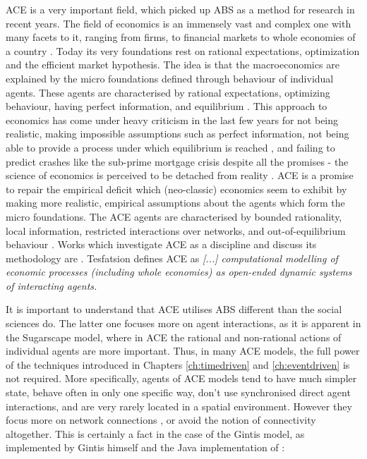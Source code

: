 ACE is a very important field, which picked up ABS as a method for research in recent years. The field of economics is an immensely vast and complex one with many facets to it, ranging from firms, to financial markets to whole economies of a country \cite{bowles_understanding_2005}. Today its very foundations rest on rational expectations, optimization and the efficient market hypothesis. The idea is that the macroeconomics are explained by the micro foundations \cite{colell_microeconomic_1995} defined through behaviour of individual agents. These agents are characterised by rational expectations, optimizing behaviour, having perfect information, and equilibrium \cite{focardi_is_2015}.
This approach to economics has come under heavy criticism in the last few years for not being realistic, making impossible assumptions such as perfect information, not being able to provide a process under which equilibrium is reached \cite{kirman_complex_2010}, and failing to predict crashes like the sub-prime mortgage crisis despite all the promises - the science of economics is perceived to be detached from reality \cite{focardi_is_2015}. 
ACE is a promise to repair the empirical deficit which (neo-classic) economics seem to exhibit by making more realistic, empirical assumptions about the agents which form the micro foundations. The ACE agents are characterised by bounded rationality, local information, restricted interactions over networks, and out-of-equilibrium behaviour \cite{farmer_economy_2009}. 
Works which investigate ACE as a discipline and discuss its methodology are \cite{ballot_agent-based_2015,blume_introduction_2015,richiardi_agent-based_2007,tesfatsion_agent-based_2006}.
Tesfatsion \cite{tesfatsion_agent-based_2017} defines ACE as \textit{[...] computational modelling of economic processes (including whole economies) as open-ended dynamic systems of interacting agents.}

It is important to understand that ACE utilises ABS different than the social sciences do. The latter one focuses more on agent interactions, as it is apparent in the Sugarscape model, where in ACE the rational and non-rational actions of individual agents are more important. Thus, in many ACE models, the full power of the techniques introduced in Chapters \ref{ch:timedriven} and \ref{ch:eventdriven} is not required. More specifically, agents of ACE models tend to have much simpler state, behave often in only one specific way, don't use synchronised direct agent interactions, and are very rarely located in a spatial environment. However they focus more on network connections \cite{glasserman_contagion_2015,wilhite_economic_2006}, or avoid the notion of connectivity altogether. This is certainly a fact in the case of the Gintis model, as implemented by Gintis himself and the Java implementation of \cite{evensen_extensible_2010}: 

